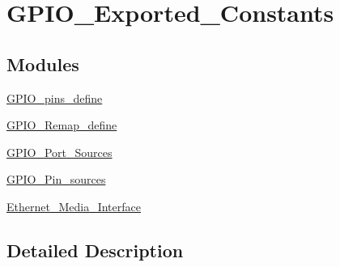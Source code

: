 \hypertarget{group___g_p_i_o___exported___constants}{}\section{G\+P\+I\+O\+\_\+\+Exported\+\_\+\+Constants}
\label{group___g_p_i_o___exported___constants}
\subsection*{Modules}
\begin{DoxyCompactItemize}
\item 
\mbox{\hyperlink{group___g_p_i_o__pins__define}{G\+P\+I\+O\+\_\+pins\+\_\+define}}
\item 
\mbox{\hyperlink{group___g_p_i_o___remap__define}{G\+P\+I\+O\+\_\+\+Remap\+\_\+define}}
\item 
\mbox{\hyperlink{group___g_p_i_o___port___sources}{G\+P\+I\+O\+\_\+\+Port\+\_\+\+Sources}}
\item 
\mbox{\hyperlink{group___g_p_i_o___pin__sources}{G\+P\+I\+O\+\_\+\+Pin\+\_\+sources}}
\item 
\mbox{\hyperlink{group___ethernet___media___interface}{Ethernet\+\_\+\+Media\+\_\+\+Interface}}
\end{DoxyCompactItemize}


\subsection{Detailed Description}
